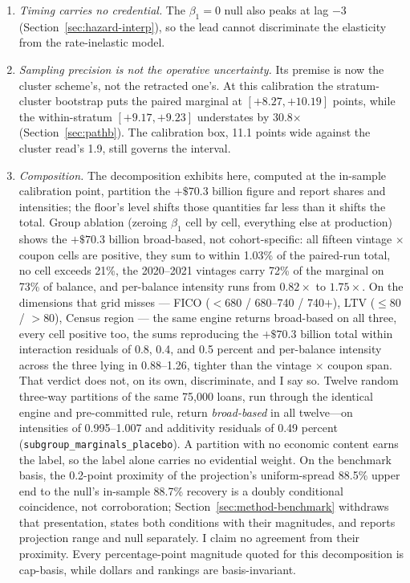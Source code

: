 \begin{enumerate}
is an assumption rather than a measurement. The hull's lower edge is thus narrower than the layer the paper calls binding; the two must be quoted together, not the hull alone.

\item \emph{Timing carries no credential.} The $\beta_1 = 0$ null also peaks at lag $-3$ (Section~\ref{sec:hazard-interp}), so the lead cannot discriminate the elasticity from the rate-inelastic model.

\item \emph{Sampling precision is not the operative uncertainty.} Its premise is now the cluster scheme's, not the retracted one's. At this calibration the stratum-cluster bootstrap puts the paired marginal at $[+8.27, +10.19]$ points, while the within-stratum $[+9.17, +9.23]$ understates by 30.8$\times$ (Section~\ref{sec:pathb}). The calibration box, 11.1 points wide against the cluster read's 1.9, still governs the interval.

\item \emph{Composition.} The decomposition exhibits here, computed at the in-sample calibration point, partition the $+\$70.3$ billion figure and report shares and intensities; the floor's level shifts those quantities far less than it shifts the total. Group ablation (zeroing $\beta_1$ cell by cell, everything else at production) shows the $+\$70.3$ billion broad-based, not cohort-specific: all fifteen vintage $\times$ coupon cells are positive, they sum to within 1.03\% of the paired-run total, no cell exceeds 21\%, the 2020--2021 vintages carry 72\% of the marginal on 73\% of balance, and per-balance intensity runs from $0.82\times$ to $1.75\times$. On the dimensions that grid misses --- FICO ($<$680 / 680--740 / 740$+$), LTV ($\leq$80 / $>$80), Census region --- the same engine returns broad-based on all three, every cell positive too, the sums reproducing the $+\$70.3$ billion total within interaction residuals of 0.8, 0.4, and 0.5 percent and per-balance intensity across the three lying in 0.88--1.26, tighter than the vintage $\times$ coupon span. That verdict does not, on its own, discriminate, and I say so. Twelve random three-way partitions of the same 75,000 loans, run through the identical engine and pre-committed rule, return \emph{broad-based} in all twelve---on intensities of 0.995--1.007 and additivity residuals of 0.49 percent (\texttt{subgroup\_marginals\_placebo}). A partition with no economic content earns the label, so the label alone carries no evidential weight. On the benchmark basis, the 0.2-point proximity of the projection's uniform-spread 88.5\% upper end to the null's in-sample 88.7\% recovery is a doubly conditional coincidence, not corroboration; Section~\ref{sec:method-benchmark} withdraws that presentation, states both conditions with their magnitudes, and reports projection range and null separately. I claim no agreement from their proximity. Every percentage-point magnitude quoted for this decomposition is cap-basis, while dollars and rankings are basis-invariant.


\end{enumerate}
